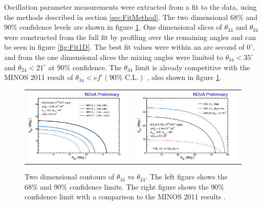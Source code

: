 Oscillation parameter measurements were extracted from a fit to the data, using the methods described in section \ref{sec:FitMethod}. The two dimensional $68\%$ and $90\%$ confidence levels are shown in figure \ref{fig:Fit2D}. One dimensional slices of $\theta_{24}$ and $\theta_{34}$ were constructed from the full fit by profiling over the remaining angles and can be seen in figure \ref{fig:Fit1D}. The best fit values were within an arc second of $0^\circ$, and from the one dimensional slices the mixing angles were limited to $\theta_{34} < 35^\circ$ and $\theta_{24} < 21^\circ$ at $90\%$ confidence. The $\theta_{34}$ limit is already competitive with the MINOS 2011 result of $\theta_{34} < ef^\circ (90\% \mbox{ C.L.})$ \cite{ref:MINOSSterile}, also shown in figure \ref{fig:Fit2D}.
\begin{figure}[htbp]
  \centering
  \begin{tabular}{c c}
    \includegraphics[width=.47\textwidth]{figures/Fits/2D3424.png} &
    \includegraphics[width=.47\textwidth]{figures/Fits/2D3424_MINOS.png} \\
  \end{tabular}
  \caption[Two Dimensional $\theta_{34}$ vs $\theta_{24}$ Contours]{Two dimensional contours of $\theta_{34}$ vs $\theta_{24}$. The left figure shows the $68\%$ and $90\%$ confidence limits. The right figure shows the $90\%$ confidence limit with a comparison to the MINOS 2011 results \cite{ref:MINOSSterile}.}
  \label{fig:Fit2D}
\end{figure}

